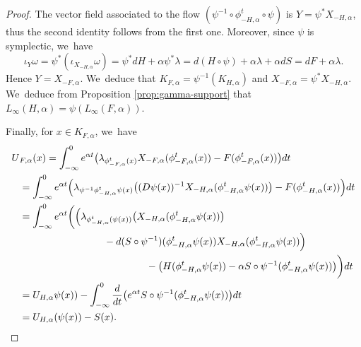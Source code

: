 \documentclass[JEP,XML,SOM,Unicode,NoFloatCountersInSection,published]{cedram}
\theoremstyle{definition}
\begin{document}
\begin{proof} The vector field associated to the flow $(\psi^{-1}\circ \phi^t_{-H, \alpha}\circ \psi)$ is $Y=\psi^*X_{-H,\alpha}$, thus the second identity follows from the first one. Moreover, since $\psi$ is symplectic, we~have\vspace*{-3pt}
\begin{equation*}\iota_Y\omega=\psi^*(\iota_{X_{-H,\alpha}}\omega)=\psi^*dH+\alpha\psi^*\lambda=d(H\circ\psi)+\alpha\lambda +\alpha dS=dF+\alpha\lambda.
\end{equation*}
Hence $Y=X_{-F, \alpha}$. We~deduce that $K_{F,\alpha}=\psi^{-1}(K_{H,\alpha})$ and $X_{-F,\alpha}=\psi^*X_{-H,\alpha}$. We~deduce from Proposition \ref{prop:gamma-support} that $L_\infty(H, \alpha)=\psi(L_\infty(F, \alpha))$.

Finally, for $x\in K_{F,\alpha}$, we~have
\begin{align*}
U&{}_{F, \alpha}(x)=\int_{-\infty}^0e^{\alpha t}\bigl(\lambda_{\phi^t_{-F,\alpha}(x)}X_{-F,\alpha} (\phi_{-F,\alpha}^t(x))-F(\phi^t_{-F,\alpha}(x))\bigr)dt\\
&=\int_{-\infty}^0e^{\alpha t}\Bigl(\lambda_{\psi^{-1}\phi^t_{-H,\alpha} \psi(x)}\bigl((D\psi(x))^{-1}X_{-H,\alpha}(\phi^t_{-H, \alpha} \psi(x))\bigr)-F(\phi^t_{-H,\alpha}(x))\Bigr)dt\\
&=\int_{-\infty}^0e^{\alpha t}
\biggl(
\Bigl(\lambda_{\phi^t_{-H,\alpha}(\psi(x))}
\bigl(X_{-H,\alpha} (\phi^t_{-H,\alpha}\psi(x))\bigr)\\
&\hspace*{3cm}-d(S\circ \psi^{-1})(\phi^t_{-H, \alpha} \psi(x))X_{-H,\alpha} (\phi^t_{-H,\alpha}\psi(x))\Bigr)\\
&\hspace*{4.5cm} -\bigl(H(\phi^t_{-H, \alpha}\psi(x))-\alpha S\circ\psi^{-1}(\phi^t_{-H,\alpha} \psi(x))\bigr)\biggr)dt\\
&=U_{H, \alpha}\psi(x))-\int_{-\infty}^0\frac{d}{dt}\bigl(e^{\alpha t}S\circ\psi^{-1}(\phi^t_{-H,\alpha}\psi(x))\bigr)dt\\
&=U_{H,\alpha}(\psi(x))-S(x).\qedhere
\end{align*}
\end{proof}
\end{document}
